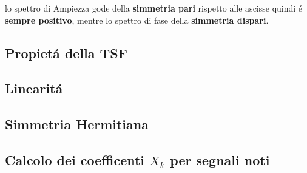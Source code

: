             lo spettro di Ampiezza gode della \textbf{simmetria pari} rispetto alle ascisse quindi é \textbf{sempre positivo}, mentre lo spettro di fase della \textbf{simmetria dispari}.
        \subsection{Propietá della TSF}
            \subsection{Linearitá}
            \subsection{Simmetria Hermitiana}
        
        \subsection{Calcolo dei coefficenti $X_k$ per segnali noti}
